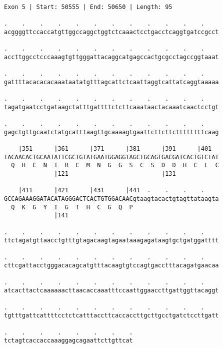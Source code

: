 \documentclass{article}
\begin{document}
\begin{Verbatim}
Exon 5 | Start: 50555 | End: 50650 | Length: 95
 
.    .    .    .    .    .    .    .    .    .    .    .    
acggggttccaccatgttggccaggctggtctcaaactcctgacctcaggtgatccgcct
  
.    .    .    .    .    .    .    .    .    .    .    .    
accttggcctcccaaagtgttgggattacaggcatgagccactgcgcctagccggtaaat
  
.    .    .    .    .    .    .    .    .    .    .    .    
gattttacacacacaaataatatgtttagcattctcaattaggtcattatcaggtaaaaa
  
.    .    .    .    .    .    .    .    .    .    .    .    
tagatgaatcctgataagctatttgattttctcttcaaataactacaaatcaactcctgt
  
.    .    .    .    .    .    .    .    .    .    .    .    
gagctgttgcaatctatgcatttaagttgcaaaagtgaattcttcttcttttttttcaag
  
    |351      |361      |371      |381      |391      |401  
TACAACACTGCAATATTCGCTGTATGAATGGAGGTAGCTGCAGTGACGATCACTGTCTAT
  Q  H  C  N  I  R  C  M  N  G  G  S  C  S  D  D  H  C  L  C
              |121                          |131            
  
    |411      |421      |431      |441  .    .    .    .    
GCCAGAAAGGATACATAGGGACTCACTGTGGACAACgtaagtacactgtagttataagta
  Q  K  G  Y  I  G  T  H  C  G  Q  P                        
              |141                                          
  
.    .    .    .    .    .    .    .    .    .    .    .    
ttctagatgttaacctgtttgtagacaagtagaataaagagataagtgctgatggatttt
  
.    .    .    .    .    .    .    .    .    .    .    .    
cttcgattacctgggacacagcatgtttacaagtgtccagtgacctttacagatgaacaa
  
.    .    .    .    .    .    .    .    .    .    .    .    
atcacttactcaaaaaacttaacaccaaatttccaattggaaccttgattggttacaggt
  
.    .    .    .    .    .    .    .    .    .    .    .    
tgtttgattcattttcctctcatttaccttcaccaccttgcttgcctgatctccttgatt
  
.    .    .    .    .    .    .    .
tctagtcaccaccaaaggagcagaattcttgttcat
\end{Verbatim}
\newpage
\end{document}
